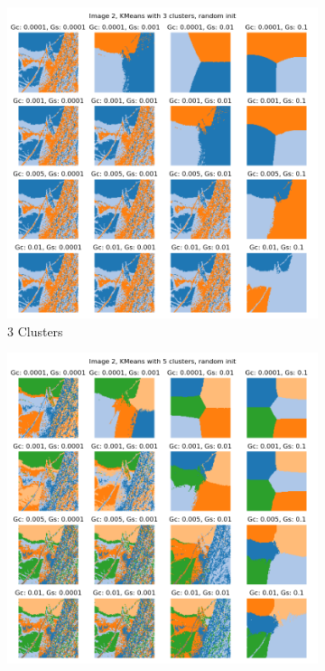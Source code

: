 \documentclass{homework}
\begin{document}
\begin{figure}[H]
    \centering
    \begin{subfigure}{0.32\textwidth}
        \centering
        \includegraphics[width=\textwidth]{output_grid/image2_kmeans-random-3.png}
        \caption{3 Clusters}
    \end{subfigure}
    \begin{subfigure}{0.32\textwidth}
        \centering
        \includegraphics[width=\textwidth]{output_grid/image2_kmeans-random-5.png}

\end{subfigure}
\end{figure}
\end{document}
